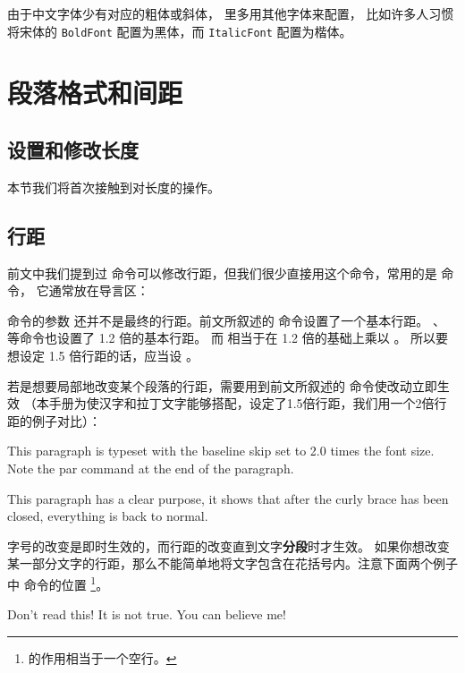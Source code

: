 由于中文字体少有对应的粗体或斜体， 里多用其他字体来配置，
比如许多人习惯将宋体的 \texttt{BoldFont} 配置为黑体，而 \texttt{ItalicFont} 配置为楷体。

\section{段落格式和间距}

\subsection{设置和修改长度}

本节我们将首次接触到对长度的操作。

\subsection{行距}

前文中我们提到过  命令可以修改行距，但我们很少直接用这个命令，常用的是 命令，
它通常放在导言区：
\begin{command}
\end{command}

 命令的参数  还并不是最终的行距。前文所叙述的  命令设置了一个基本行距。
、 等命令也设置了 1.2 倍的基本行距。
而  相当于在 1.2 倍的基础上乘以 。
所以要想设定 1.5 倍行距的话，应当设  。

若是想要局部地改变某个段落的行距，需要用到前文所叙述的  命令使改动立即生效
（本手册为使汉字和拉丁文字能够搭配，设定了1.5倍行距，我们用一个2倍行距的例子对比）：
\begin{example}
{\linespread{1.67}\selectfont
This paragraph is typeset with
the baseline skip set to 2.0 times
the font size. Note the par
command at the end of the
paragraph.\par}

This paragraph has a clear
purpose, it shows that after the
curly brace has been closed,
everything is back to normal.
\end{example}

字号的改变是即时生效的，而行距的改变直到文字\textbf{分段}时才生效。
如果你想改变某一部分文字的行距，那么不能简单地将文字包含在花括号内。注意下面两个例子中 命令的位置%
\footnote{ 的作用相当于一个空行。}。

\begin{example}
{\Large Don't read this!
 It is not true.
 You can believe me!\par}
\end{example}

